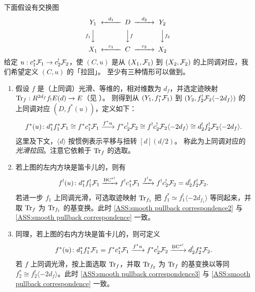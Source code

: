 下面假设有交换图
\[\begin{CD}
Y_1@<d_1<< D@>d_2>> Y_2\\
@Vf_1VV@VVfV@VVf_2V\\
X_1@<c_1<<C@>c_2>>X_2
\end{CD}\]
给定 $u:c_1^*{\mathcal F}_1\to c_2^!{\mathcal F}_2$，使 $(C,u)$ 是从 $(X_1,{\mathcal F}_1)$ 到 $(X_2,{\mathcal F}_2)$ 的上同调对应，我们希望定义 $(C,u)$ 的「拉回」。
至少有三种情形可以做到。
\begin{enumerate}
\item[(1)] 假设 $f$ 是（上同调）光滑、等维的，相对维数为 $d_f$，并选定迹映射 ${\operatorname{Tr}}_f: R^{2d_f}f_!E(d)\to E$（见 \cite[定义 A.1.18]{XZ}）。
则得到从 $(Y_1, f_1^*\mathcal{F}_1)$ 到 $(Y_2, f_2^!\mathcal{F}_2\langle-2d_f\rangle)$ 的上同调对应 $(D, f^*(u))$，定义如下：
\begin{equation}
\label{ASS:smooth pullback correspondence} 
f^*(u)\colon d_1^*f_1^*{\mathcal F}_1\cong f^*c_1^*{\mathcal F}_1\xrightarrow{f^*u} f^*c_2^!{\mathcal F}_2\cong f^!c_2^!{\mathcal F}_2\langle-2d_f\rangle \cong d_2^!f_2^!{\mathcal F}_2\langle-2d_f\rangle.
\end{equation}
这里及下文，$\langle d\rangle$ 按惯例表示平移与扭转 $[d](d/2)$。
称此为上同调对应的\emph{光滑拉回}。注意它依赖于 ${\operatorname{Tr}}_f$ 的选取。

\item[(2)] 若上图的左内方块是笛卡儿的，则有
\begin{equation}
\label{ASS:smooth pullback correspondence2} 
f^!(u)\colon d_1^*f_1^!{\mathcal F}_1\xrightarrow{\operatorname{BC}^{*!}} f^!c_1^*{\mathcal F}_1\xrightarrow{f^!u}f^!c_2^!{\mathcal F}_2= d_2^!f_2^!{\mathcal F}_2.
\end{equation}
若进一步 $f_1$ 上同调光滑，可选取迹映射 ${\operatorname{Tr}}_{f_1}$ 把 $f^*_1\simeq f^!_1\langle-2d_{f_1}\rangle$ 等同起来，并取 ${\operatorname{Tr}}_f$ 为 ${\operatorname{Tr}}_{f_1}$ 的基变换。此时 \eqref{ASS:smooth pullback correspondence2} 与 \eqref{ASS:smooth pullback correspondence} 一致。

\item[(3)] 同理，若上图的右内方块是笛卡儿的，则可定义
\begin{equation}
\label{ASS:smooth pullback correspondence3} 
f^*(u)\colon d_1^*f_1^*{\mathcal F}_1= f^*c_1^*{\mathcal F}_1\xrightarrow{f^*u} f^*c_2^!{\mathcal F}_2\xrightarrow{\operatorname{BC}^{*!}} d_2^! f_2^*{\mathcal F}_2.
\end{equation}
若 $f$ 上同调光滑，按上面选取 ${\operatorname{Tr}}_f$，并取 ${\operatorname{Tr}}_{f_2}$ 为 ${\operatorname{Tr}}_f$ 的基变换以等同 $f_2^*\cong f_2^!\langle-2d_{f}\rangle$。此时 \eqref{ASS:smooth pullback correspondence3} 与 \eqref{ASS:smooth pullback correspondence} 一致。
\end{enumerate}

